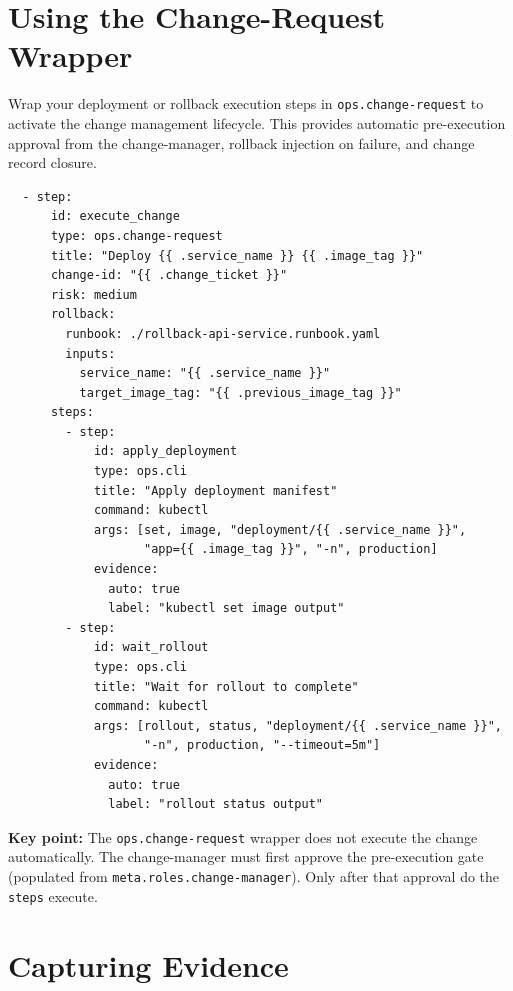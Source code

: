 \section{Using the Change-Request Wrapper}
\label{sec:authoring-change-request}

Wrap your deployment or rollback execution steps in \texttt{ops.change-request} to activate
the change management lifecycle. This provides automatic pre-execution approval from the
change-manager, rollback injection on failure, and change record closure.

\begin{verbatim}
  - step:
      id: execute_change
      type: ops.change-request
      title: "Deploy {{ .service_name }} {{ .image_tag }}"
      change-id: "{{ .change_ticket }}"
      risk: medium
      rollback:
        runbook: ./rollback-api-service.runbook.yaml
        inputs:
          service_name: "{{ .service_name }}"
          target_image_tag: "{{ .previous_image_tag }}"
      steps:
        - step:
            id: apply_deployment
            type: ops.cli
            title: "Apply deployment manifest"
            command: kubectl
            args: [set, image, "deployment/{{ .service_name }}",
                   "app={{ .image_tag }}", "-n", production]
            evidence:
              auto: true
              label: "kubectl set image output"
        - step:
            id: wait_rollout
            type: ops.cli
            title: "Wait for rollout to complete"
            command: kubectl
            args: [rollout, status, "deployment/{{ .service_name }}",
                   "-n", production, "--timeout=5m"]
            evidence:
              auto: true
              label: "rollout status output"
\end{verbatim}

\textbf{Key point:} The \texttt{ops.change-request} wrapper does not execute the change
automatically. The change-manager must first approve the pre-execution gate (populated from
\texttt{meta.roles.change-manager}). Only after that approval do the \texttt{steps} execute.

\section{Capturing Evidence}
\label{sec:authoring-evidence}


